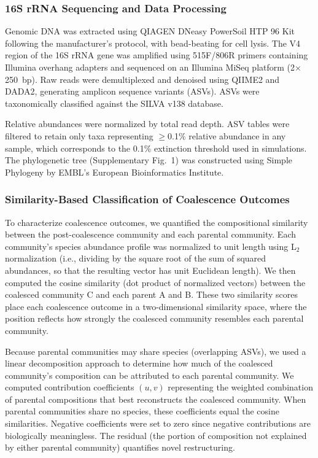 \subsubsection*{16S rRNA Sequencing and Data Processing}
\label{sec:suppl:methods:sequencing}

Genomic DNA was extracted using QIAGEN DNeasy PowerSoil HTP 96 Kit following the manufacturer's protocol, with bead-beating for cell lysis. The V4 region of the 16S rRNA gene was amplified using 515F/806R primers containing Illumina overhang adapters and sequenced on an Illumina MiSeq platform (2$\times$250~bp). Raw reads were demultiplexed and denoised using QIIME2 and DADA2, generating amplicon sequence variants (ASVs). ASVs were taxonomically classified against the SILVA v138 database.

Relative abundances were normalized by total read depth. ASV tables were filtered to retain only taxa representing $\geq$0.1\% relative abundance in any sample, which corresponds to the 0.1\% extinction threshold used in simulations. The phylogenetic tree (Supplementary Fig.~1) was constructed using Simple Phylogeny by EMBL's European Bioinformatics Institute\citep{Madeira2022}.


\subsubsection*{Similarity-Based Classification of Coalescence Outcomes}
\label{sec:suppl:classification}

To characterize coalescence outcomes, we quantified the compositional similarity between the post-coalescence community and each parental community. Each community's species abundance profile was normalized to unit length using L$_2$ normalization (i.e., dividing by the square root of the sum of squared abundances, so that the resulting vector has unit Euclidean length). We then computed the cosine similarity (dot product of normalized vectors) between the coalesced community C and each parent A and B. These two similarity scores place each coalescence outcome in a two-dimensional similarity space, where the position reflects how strongly the coalesced community resembles each parental community.

Because parental communities may share species (overlapping ASVs), we used a linear decomposition approach to determine how much of the coalesced community's composition can be attributed to each parental community. We computed contribution coefficients $(u, v)$ representing the weighted combination of parental compositions that best reconstructs the coalesced community. When parental communities share no species, these coefficients equal the cosine similarities. Negative coefficients were set to zero since negative contributions are biologically meaningless. The residual (the portion of composition not explained by either parental community) quantifies novel restructuring.


